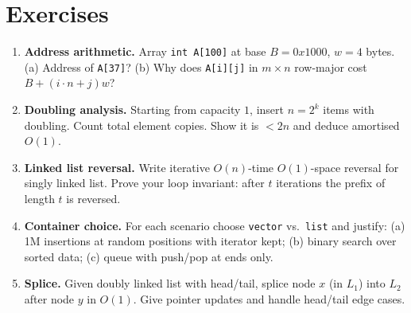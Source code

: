 \section{Exercises}
\label{sec:ch01-exercises}
\begin{enumerate}[label=E1.\arabic*, leftmargin=*, itemsep=0.7em]
    \item \textbf{Address arithmetic.} Array \texttt{int A[100]} at base $B=0x1000$, $w=4$ bytes. (a) Address of \texttt{A[37]}? (b) Why does \texttt{A[i][j]} in $m\times n$ row-major cost $B+(i\cdot n+j)w$?
    \item \textbf{Doubling analysis.} Starting from capacity $1$, insert $n=2^{k}$ items with doubling. Count total element copies. Show it is $<2n$ and deduce amortised $O(1)$.
    \item \textbf{Linked list reversal.} Write iterative $O(n)$-time $O(1)$-space reversal for singly linked list. Prove your loop invariant: after $t$ iterations the prefix of length $t$ is reversed.
    \item \textbf{Container choice.} For each scenario choose \texttt{vector} vs.\ \texttt{list} and justify: (a) 1M insertions at random positions with iterator kept; (b) binary search over sorted data; (c) queue with push/pop at ends only.
    \item \textbf{Splice.} Given doubly linked list with head/tail, splice node $x$ (in $L_{1}$) into $L_{2}$ after node $y$ in $O(1)$. Give pointer updates and handle head/tail edge cases.
\end{enumerate}
